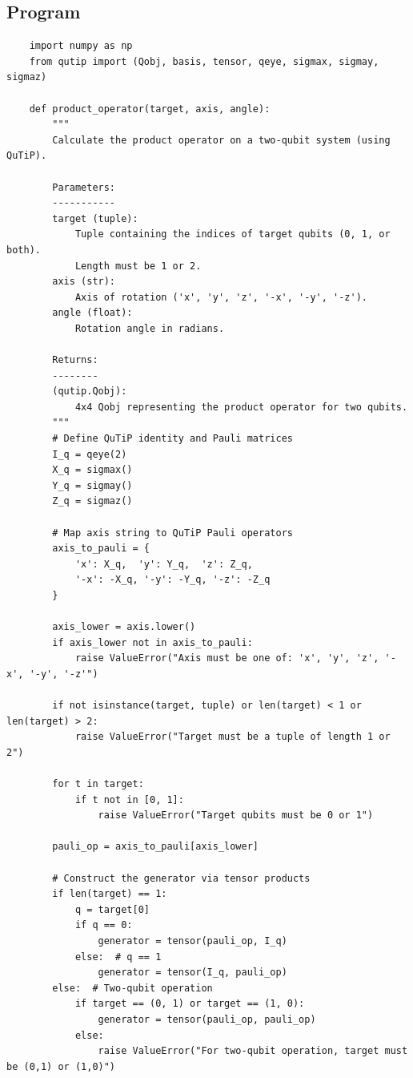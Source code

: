\documentclass[11pt]{article}
\begin{document}
\subsection*{Program}
\begin{verbatim}
    import numpy as np
    from qutip import (Qobj, basis, tensor, qeye, sigmax, sigmay, sigmaz)
    
    def product_operator(target, axis, angle):
        """
        Calculate the product operator on a two-qubit system (using QuTiP).
        
        Parameters:
        -----------
        target (tuple): 
            Tuple containing the indices of target qubits (0, 1, or both). 
            Length must be 1 or 2.
        axis (str): 
            Axis of rotation ('x', 'y', 'z', '-x', '-y', '-z').
        angle (float): 
            Rotation angle in radians.
        
        Returns:
        --------
        (qutip.Qobj): 
            4x4 Qobj representing the product operator for two qubits.
        """
        # Define QuTiP identity and Pauli matrices
        I_q = qeye(2)
        X_q = sigmax()
        Y_q = sigmay()
        Z_q = sigmaz()
        
        # Map axis string to QuTiP Pauli operators
        axis_to_pauli = {
            'x': X_q,  'y': Y_q,  'z': Z_q,
            '-x': -X_q, '-y': -Y_q, '-z': -Z_q
        }
        
        axis_lower = axis.lower()
        if axis_lower not in axis_to_pauli:
            raise ValueError("Axis must be one of: 'x', 'y', 'z', '-x', '-y', '-z'")
    
        if not isinstance(target, tuple) or len(target) < 1 or len(target) > 2:
            raise ValueError("Target must be a tuple of length 1 or 2")
        
        for t in target:
            if t not in [0, 1]:
                raise ValueError("Target qubits must be 0 or 1")
        
        pauli_op = axis_to_pauli[axis_lower]
        
        # Construct the generator via tensor products
        if len(target) == 1:
            q = target[0]
            if q == 0:
                generator = tensor(pauli_op, I_q)
            else:  # q == 1
                generator = tensor(I_q, pauli_op)
        else:  # Two-qubit operation
            if target == (0, 1) or target == (1, 0):
                generator = tensor(pauli_op, pauli_op)
            else:
                raise ValueError("For two-qubit operation, target must be (0,1) or (1,0)")
        

\end{verbatim}
\end{document}
